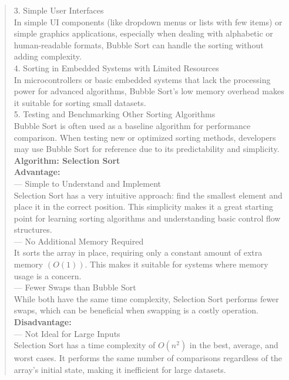\begin{quote}
    3. Simple User Interfaces \\
    In simple UI components (like dropdown menus or lists with few items) or simple graphics applications, especially when dealing with alphabetic or human-readable formats, Bubble Sort can handle the sorting without adding complexity. \\
    
    4. Sorting in Embedded Systems with Limited Resources \\
    In microcontrollers or basic embedded systems that lack the processing power for advanced algorithms, Bubble Sort's low memory overhead makes it suitable for sorting small datasets. \\
    
    5. Testing and Benchmarking Other Sorting Algorithms \\
    Bubble Sort is often used as a baseline algorithm for performance comparison. When testing new or optimized sorting methods, developers may use Bubble Sort for reference due to its predictability and simplicity. \\
    
    \vspace{10pt}
    \textbf{Algorithm: Selection Sort} \\
    
    \textbf{Advantage:} \\
    --- Simple to Understand and Implement \\
    Selection Sort has a very intuitive approach: find the smallest element and place it in the correct position. This simplicity makes it a great starting point for learning sorting algorithms and understanding basic control flow structures. \\
    
    --- No Additional Memory Required \\
    It sorts the array in place, requiring only a constant amount of extra memory $(O(1))$. This makes it suitable for systems where memory usage is a concern. \\
    
    --- Fewer Swaps than Bubble Sort \\
    While both have the same time complexity, Selection Sort performs fewer swaps, which can be beneficial when swapping is a costly operation. \\
    
    \textbf{Disadvantage:} \\
    --- Not Ideal for Large Inputs \\
    Selection Sort has a time complexity of \(O(n^2)\) in the best, average, and worst cases. It performs the same number of comparisons regardless of the array’s initial state, making it inefficient for large datasets. \\
    

\end{quote}
